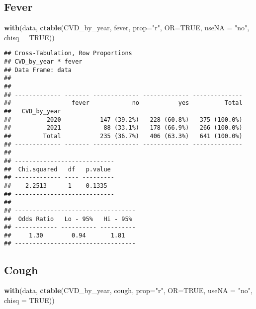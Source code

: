 \documentclass[
]{article}
\newenvironment{Shaded}{\begin{snugshade}}{\end{snugshade}}
\newcommand{\AttributeTok}[1]{\textcolor[rgb]{0.13,0.29,0.53}{#1}}
\newcommand{\ConstantTok}[1]{\textcolor[rgb]{0.56,0.35,0.01}{#1}}
\newcommand{\FunctionTok}[1]{\textcolor[rgb]{0.13,0.29,0.53}{\textbf{#1}}}
\newcommand{\NormalTok}[1]{#1}
\newcommand{\StringTok}[1]{\textcolor[rgb]{0.31,0.60,0.02}{#1}}
\begin{document}
\hypertarget{fever}{%
\subsection{Fever}\label{fever}}

\begin{Shaded}
\begin{Highlighting}[]
\FunctionTok{with}\NormalTok{(data, }\FunctionTok{ctable}\NormalTok{(CVD\_by\_year, fever, }\AttributeTok{prop=}\StringTok{"r"}\NormalTok{, }\AttributeTok{OR=}\ConstantTok{TRUE}\NormalTok{, }\AttributeTok{useNA =} \StringTok{"no"}\NormalTok{, }\AttributeTok{chisq =} \ConstantTok{TRUE}\NormalTok{))}
\end{Highlighting}
\end{Shaded}

\begin{verbatim}
## Cross-Tabulation, Row Proportions  
## CVD_by_year * fever  
## Data Frame: data  
## 
## 
## ------------- ------- ------------- ------------- --------------
##                 fever            no           yes          Total
##   CVD_by_year                                                   
##          2020           147 (39.2%)   228 (60.8%)   375 (100.0%)
##          2021            88 (33.1%)   178 (66.9%)   266 (100.0%)
##         Total           235 (36.7%)   406 (63.3%)   641 (100.0%)
## ------------- ------- ------------- ------------- --------------
## 
## ----------------------------
##  Chi.squared   df   p.value 
## ------------- ---- ---------
##    2.2513      1    0.1335  
## ----------------------------
## 
## ----------------------------------
##  Odds Ratio   Lo - 95%   Hi - 95% 
## ------------ ---------- ----------
##     1.30        0.94       1.81   
## ----------------------------------
\end{verbatim}

\hypertarget{cough}{%
\subsection{Cough}\label{cough}}

\begin{Shaded}
\begin{Highlighting}[]
\FunctionTok{with}\NormalTok{(data, }\FunctionTok{ctable}\NormalTok{(CVD\_by\_year, cough, }\AttributeTok{prop=}\StringTok{"r"}\NormalTok{, }\AttributeTok{OR=}\ConstantTok{TRUE}\NormalTok{, }\AttributeTok{useNA =} \StringTok{"no"}\NormalTok{, }\AttributeTok{chisq =} \ConstantTok{TRUE}\NormalTok{))}
\end{Highlighting}
\end{Shaded}
\end{document}
